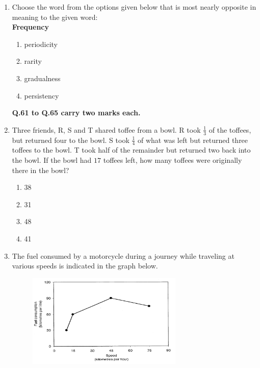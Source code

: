\documentclass[journal]{IEEEtran}
\numberwithin{equation}{enumi}
\numberwithin{figure}{enumi}
\begin{document}
\begin{enumerate}
   
\item Choose the word from the options given below that is most nearly opposite in meaning to the given word:\\
\textbf{Frequency}  \hfill{}
\begin{enumerate}
    \item  periodicity 
     \item rarity
     \item gradualness
     \item persistency
\end{enumerate}

     

\textbf{Q.61 to Q.65 carry two marks each.}
\item Three friends, R, S and T shared toffee from a bowl. R took $\frac{1}{3}$ of the toffees, but returned four to the bowl. S took $\frac{1}{4}$ of what was left but returned three toffees to the bowl. T took half of the remainder but returned two back into the bowl. If the bowl had $17$ toffees left, how many toffees were originally there in the bowl?
\hfill{}
\begin{multicols}{4}
\begin{enumerate}
   \item 38
   \item 31
   \item 48
    \item 41
\end{enumerate}
\end{multicols}


\item The fuel consumed by a motorcycle during a journey while traveling at various speeds is indicated in the graph below.
\hfill{}

\begin{figure}[ht!]
    \centering
    \includegraphics[width=0.7\textwidth]{project2.png}
    \caption{}
    \label{fig:project2.jpeg}
\end{figure}



\end{enumerate}
\end{document}
